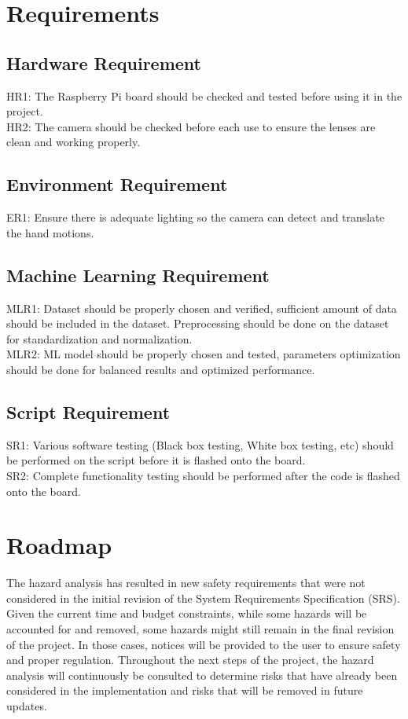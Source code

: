 \documentclass{article}
\begin{document}
\section{Requirements}
\subsection{Hardware Requirement}
HR1: The Raspberry Pi board should be checked and tested before using it in the project.\\
HR2: The camera should be checked before each use to ensure the lenses are clean and working properly.
\subsection{Environment Requirement}
ER1: Ensure there is adequate lighting so the camera can detect and translate the hand motions.
\subsection{Machine Learning Requirement}
MLR1: Dataset should be properly chosen and verified, sufficient amount of data should be included in the dataset. Preprocessing should be done on the dataset for standardization and normalization.\\
MLR2: ML model should be properly chosen and tested, parameters optimization should be done for balanced results and optimized performance.
\subsection{Script Requirement}
SR1: Various software testing (Black box testing, White box testing, etc) should be performed on the script before it is flashed onto the board.\\
SR2: Complete functionality testing should be performed after the code is flashed onto the board.

\section{Roadmap}
The hazard analysis has resulted in new safety requirements that were not considered in the initial revision of the 
System Requirements Specification (SRS). Given the current time and budget constraints, while some hazards will be accounted 
for and removed, some hazards might still remain in the final revision of the project. In those cases, notices will be provided 
to the user to ensure safety and proper regulation. Throughout the next steps of the project, the hazard analysis will continuously 
be consulted to determine risks that have already been considered in the implementation and risks that will be removed in future updates.
\end{document}

